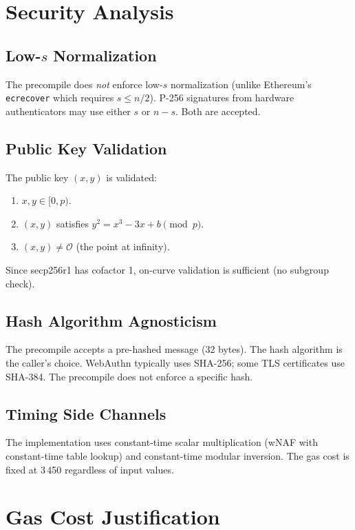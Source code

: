 \documentclass[11pt,a4paper]{article}
\begin{document}
\section{Security Analysis}

\subsection{Low-$s$ Normalization}

The precompile does \emph{not} enforce low-$s$ normalization (unlike Ethereum's
\texttt{ecrecover} which requires $s \leq n/2$). P-256 signatures from hardware
authenticators may use either $s$ or $n - s$. Both are accepted.

\subsection{Public Key Validation}

The public key $(x, y)$ is validated:
\begin{enumerate}
  \item $x, y \in [0, p)$.
  \item $(x, y)$ satisfies $y^2 = x^3 - 3x + b \pmod{p}$.
  \item $(x, y) \neq \mathcal{O}$ (the point at infinity).
\end{enumerate}
Since secp256r1 has cofactor 1, on-curve validation is sufficient (no subgroup check).

\subsection{Hash Algorithm Agnosticism}

The precompile accepts a pre-hashed message (32 bytes). The hash algorithm is the
caller's choice. WebAuthn typically uses SHA-256; some TLS certificates use SHA-384.
The precompile does not enforce a specific hash.

\subsection{Timing Side Channels}

The implementation uses constant-time scalar multiplication (wNAF with constant-time
table lookup) and constant-time modular inversion. The gas cost is fixed at 3\,450
regardless of input values.

\section{Gas Cost Justification}
\end{document}
